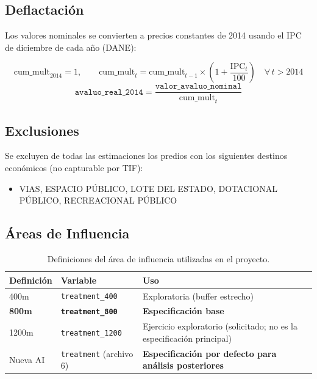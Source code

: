 \documentclass[12pt, a4paper]{article}
\begin{document}
\subsection{Deflactación}

Los valores nominales se convierten a precios constantes de 2014 usando el IPC de diciembre de cada año (DANE):

\[
\text{cum\_mult}_{2014} = 1, \qquad
\text{cum\_mult}_{t} = \text{cum\_mult}_{t-1} \times \left(1 + \frac{\text{IPC}_t}{100}\right) \quad \forall\, t > 2014
\]
\[
\texttt{avaluo\_real\_2014} = \frac{\texttt{valor\_avaluo\_nominal}}{\text{cum\_mult}_t}
\]

\subsection{Exclusiones}

Se excluyen de todas las estimaciones los predios con los siguientes destinos económicos (no capturable por TIF):

\begin{itemize}
  \item VIAS, ESPACIO PÚBLICO, LOTE DEL ESTADO, DOTACIONAL PÚBLICO, RECREACIONAL PÚBLICO
\end{itemize}

\subsection{Áreas de Influencia}

\begin{table}[h!]
\centering
\begin{tabular}{@{}L{3.5cm} L{3.5cm} L{7cm}@{}}
\toprule
\textbf{Definición} & \textbf{Variable} & \textbf{Uso} \\
\midrule
400m & \texttt{treatment\_400} & Exploratoria (buffer estrecho) \\
\textbf{800m} & \textbf{\texttt{treatment\_800}} & \textbf{Especificación base} \\
1200m & \texttt{treatment\_1200} & Ejercicio exploratorio (solicitado; no es la especificación principal) \\
Nueva AI & \texttt{treatment} (archivo 6) & \textbf{Especificación por defecto para análisis posteriores} \\
\bottomrule
\end{tabular}
\caption{Definiciones del área de influencia utilizadas en el proyecto.}
\end{table}
\end{document}
